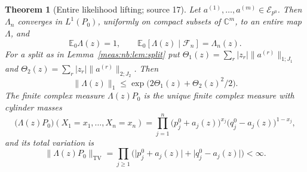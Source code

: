 \documentclass[11pt]{article}
\numberwithin{equation}{section}
\newtheorem{theorem}{Theorem}[section]
\theoremstyle{definition}
\theoremstyle{remark}
\newcommand{\C}{\mathbb C}
\newcommand{\E}{\mathbb E}
\newcommand{\TV}{\mathrm{TV}}
\newcommand{\norm}[1]{\lVert#1\rVert}
\newcommand{\abs}[1]{\lvert#1\rvert}
\newcommand{\Erow}{\mathcal E_{p^0}}
\begin{document}
\begin{theorem}[Entire likelihood lifting; source 17]\label{meas:nb:thm:entire}
Let $a^{(1)},\ldots,a^{(m)}\in\Erow$. Then $\Lambda_n$ converges in $L^1(P_0)$, uniformly
on compact subsets of $\C^m$, to an entire map $\Lambda$, and
\begin{equation}\label{meas:nb:eq:entire-martingale}
 \E_0\Lambda(z)=1,\qquad \E_0[\Lambda(z)\mid\mathcal F_n]=\Lambda_n(z).
\end{equation}
For a split as in Lemma~\ref{meas:nb:lem:split} put
$\Theta_1(z)=\sum_r\abs{z_r}\norm{a^{(r)}}_{1;J_1}$ and
$\Theta_2(z)=\sum_r\abs{z_r}\norm{a^{(r)}}_{2;J_2}$. Then
\begin{equation}\label{meas:nb:eq:entire-bound}
 \norm{\Lambda(z)}_1\le\exp\bigl(2\Theta_1(z)+\Theta_2(z)^2/2\bigr).
\end{equation}
The finite complex measure $\Lambda(z)P_0$ is the unique finite complex measure with
cylinder masses
\begin{equation}\label{meas:nb:eq:complex-cylinders}
 \bigl(\Lambda(z)P_0\bigr)(X_1=x_1,\ldots,X_n=x_n)
 =\prod_{j=1}^n\bigl(p_j^0+a_j(z)\bigr)^{x_j}\bigl(q_j^0-a_j(z)\bigr)^{1-x_j},
\end{equation}
and its total variation is
\begin{equation}\label{meas:nb:eq:tv-product}
 \norm{\Lambda(z)P_0}_\TV=\prod_{j\ge1}\bigl(\abs{p_j^0+a_j(z)}+\abs{q_j^0-a_j(z)}\bigr)<\infty .
\end{equation}
\end{theorem}
\end{document}
